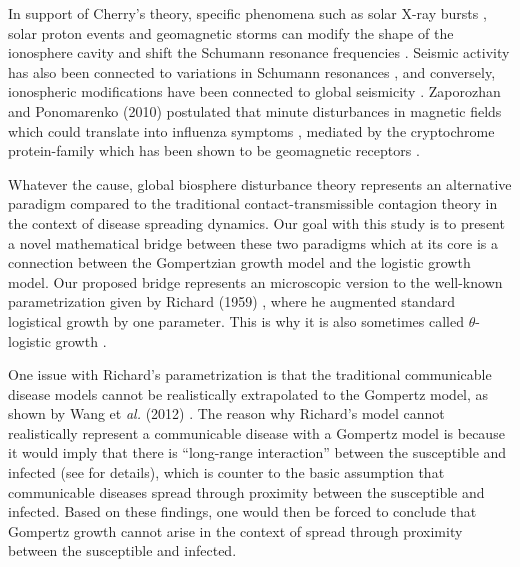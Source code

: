 \documentclass{article}
\begin{document}
In support of Cherry's theory, specific phenomena such as solar X-ray bursts \cite{dyrda2015novel,roldugin2004schumann,satori2005response,satori2016effects,shvets2017effect}, solar proton events \cite{roldugin2004schumann,schlegel1999schumann,singh2014x} and geomagnetic storms \cite{pazos2019analysis,salinas2016solar} can modify the shape of the ionosphere cavity and shift the Schumann resonance frequencies \cite{kudintseva2018modifications,satori2016effects,zhou2015studies}. Seismic activity has also been connected to variations in Schumann resonances \cite{christofilakis2019significant,galuk2019scattering,hayakawa2020scattering}, and conversely, ionospheric modifications have been connected to global seismicity \cite{Marchitelli2020}. Zaporozhan and Ponomarenko (2010) postulated that minute disturbances in magnetic fields which could translate into influenza symptoms \cite{zaporozhan2010mechanisms}, mediated by the cryptochrome protein-family which has been shown to be geomagnetic receptors \cite{rodgers2009chemical,engels2014anthropogenic,hiscock2016quantum}.

Whatever the cause, global biosphere disturbance theory represents an alternative paradigm compared to the traditional contact-transmissible contagion theory in the context of disease spreading dynamics. Our goal with this study is to present a novel mathematical bridge between these two paradigms which at its core is a connection between the Gompertzian growth model and the logistic growth model. Our proposed bridge represents an microscopic version to the well-known parametrization given by Richard (1959) \cite{richards1959flexible}, where he augmented standard logistical growth by one parameter. This is why it is also sometimes called $\theta$-logistic growth \cite{petroni2020logistic}.

 One issue with Richard's parametrization is that the traditional communicable disease models cannot be realistically extrapolated to the Gompertz model, as shown by Wang et \textit{al.} (2012) \cite{wang2012richards}. The reason why Richard's model cannot realistically represent a communicable disease with a Gompertz model is because it would imply that there is ``long-range interaction'' between the susceptible and infected (see \cite{petroni2020logistic} for details), which is counter to the basic assumption that communicable diseases spread through proximity between the susceptible and infected. Based on these findings, one would then be forced to conclude that Gompertz growth cannot arise in the context of spread through proximity between the susceptible and infected.
\end{document}
